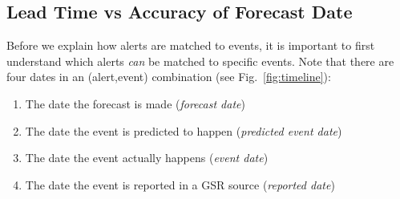 \subsection{Lead Time vs Accuracy of Forecast Date}
Before we explain how alerts are matched to events, it is important to
first understand which alerts {\it can} be matched to specific events.
Note that there are four dates in an (alert,event) combination (see Fig.~\ref{fig:timeline}):
\begin{enumerate}
\item The date the forecast is made ({\it forecast date})
\item The date the event is predicted to happen ({\it predicted event date})
\item The date the event actually happens ({\it event date})
\item The date the event is reported in a GSR source ({\it reported date})
\end{enumerate}

\iffalse
\subsection{Quality Score}
The Quality score is defined as $$QS = (LS + DS)*2$$ where LS and DS denote location score and date score respectively. The location score is defined based on the kilometre distance between the predicted location and actual location. An alert can be matched to an event, if and only if it is within a 300km radius of the event location. The location score for an alert $Y$ with respect to an event $X$ is defined as $$LS=1 - min(dist(X,Y), 300) / 300 $$
The date score is defined similarly as $$DS = 1 - min( (X-Y), MAXINTERVAL)/MAXINTERVAL$$ where MAXINTERVAL  can be anything. For our experiments, a MAXINTERVAL of 7 days is used. Again a matching cannot occur if $DS=0$
\fi
